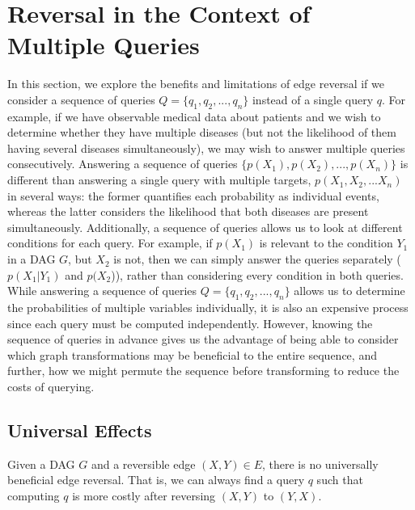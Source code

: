 \section{Reversal in the Context of Multiple Queries} 
\null \quad \quad In this section, we explore the benefits and limitations of edge reversal if we consider a sequence of queries $Q = \{q_{1}, q_{2}, ..., q_{n}\}$ instead of a single query $q$. For example, if we have observable medical data about patients and we wish to determine whether they have multiple diseases (but not the likelihood of them having several diseases simultaneously), we may wish to answer multiple queries consecutively. \newline
\null \quad \quad Answering a sequence of queries $\{p(X_{1}), p(X_{2}), ..., p(X_{n})\}$ is different than answering a single query with multiple targets, $p(X_{1}, X_{2}, ... X_{n})$ in several ways: the former quantifies each probability as individual events, whereas the latter considers the likelihood that both diseases are present simultaneously. Additionally, a sequence of queries allows us to look at different conditions for each query. For example, if $p(X_{1})$ is relevant to the condition $Y_{1}$ in a DAG $G$, but $X_{2}$ is not, then we can simply answer the queries separately ($p(X_{1}|Y_{1})$ and $p(X_{2}$)), rather than considering every condition in both queries. \newline
\null \quad \quad While answering a sequence of queries $Q=\{q_{1}, q_{2}, ..., q_{n}\}$ allows us to determine the probabilities of multiple variables individually, it is also an expensive process since each query must be computed independently. However, knowing the sequence of queries in advance gives us the advantage of being able to consider which graph transformations may be beneficial to the entire sequence, and further, how we might permute the sequence before transforming to reduce the costs of querying. 

\subsection{Universal Effects}

\begin{theorem}\label{thm:universalrev}
Given a DAG $G$ and a reversible edge $(X,Y) \in E$, there is no universally beneficial edge reversal. That is, we can always find a query $q$ such that computing $q$ is more costly after reversing $(X,Y)$ to $(Y,X)$. 
\end{theorem}

